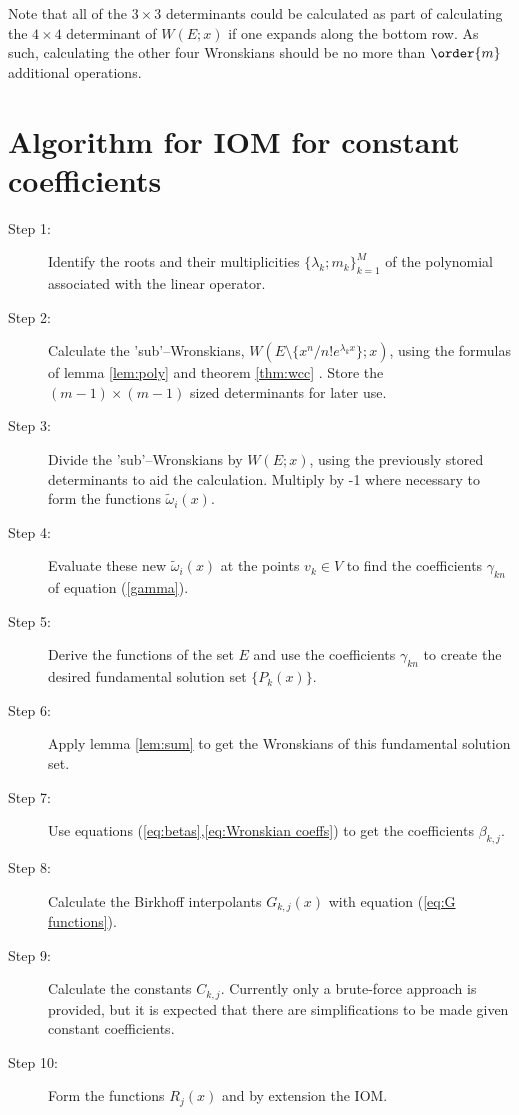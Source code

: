 \documentclass{book}
\begin{document}
Note that all of the $3 \times 3$ determinants could be calculated as part of calculating the $4 \times 4$ determinant of $W(E;x)$ if one expands along the bottom row.
As such, calculating the other four Wronskians should be no more than $\order{m}$ additional operations.

\section{Algorithm for IOM for constant coefficients}

\begin{description}
\item[Step 1:] Identify the roots and their multiplicities $\{ \lambda_k ; m_k \}_{k=1}^M$ of the polynomial associated with the linear operator.
\item[Step 2:] Calculate the 'sub'--Wronskians, $W(E \setminus \{x^n/n! e^{\lambda_k x} \} ; x)$, using the formulas of lemma \ref{lem:poly} and theorem \ref{thm:wcc} .
Store the $(m-1) \times (m-1)$ sized determinants for later use.
\item[Step 3:] Divide the 'sub'--Wronskians by $W(E;x)$, using the previously stored determinants to aid the calculation.
Multiply by -1 where necessary to form the functions $\tilde{\omega}_i(x)$.
\item[Step 4:] Evaluate these new $\tilde{\omega}_i(x)$ at the points $v_k \in V$ to find the coefficients $\gamma_{kn}$ of equation (\ref{gamma}).
\item[Step 5:] Derive the functions of the set $E$ and use the coefficients $\gamma_{kn}$ to create the desired fundamental solution set $\{ P_k(x) \}$.
\item[Step 6:] Apply lemma \ref{lem:sum} to get the Wronskians of this fundamental solution set.
\item[Step 7:] Use equations (\ref{eq:betas},\ref{eq:Wronskian coeffs}) to get the coefficients $\beta_{k,j}$.
\item[Step 8:] Calculate the Birkhoff interpolants $G_{k,j}(x)$ with equation (\ref{eq:G functions}).
\item[Step 9:] Calculate the constants $C_{k,j}$.
Currently only a brute-force approach is provided, but it is expected that there are simplifications to be made given constant coefficients.
\item[Step 10:] Form the functions $R_j(x)$ and by extension the IOM.
\end{description}



\end{document}
